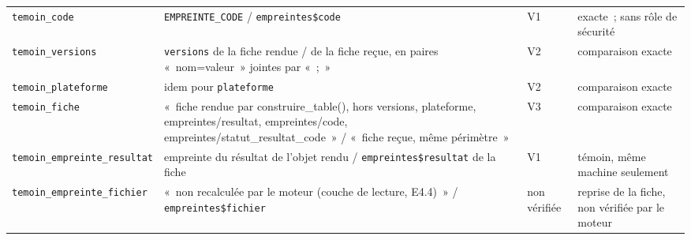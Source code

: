 \documentclass[a4paper,11pt]{article}
\newcommand{\code}[1]{\texttt{\small #1}}
\begin{document}
{\begin{longtable}{@{}p{4.8cm}p{5.1cm}p{2.2cm}p{2.5cm}@{}}
\code{temoin\_code} & \code{EMPREINTE\_CODE} / \code{empreintes\$code} & V1 & exacte~; sans rôle de sécurité \\
\code{temoin\_versions} & \code{versions} de la fiche rendue / de la fiche reçue, en paires «~nom=valeur~» jointes par «~;~» & V2 & comparaison exacte \\
\code{temoin\_plateforme} & idem pour \code{plateforme} & V2 & comparaison exacte \\
\code{temoin\_fiche} & «~fiche rendue par construire\_table(), hors versions, plateforme, empreintes/resultat, empreintes/code, empreintes/statut\_resultat\_code~» / «~fiche reçue, même périmètre~» & V3 & comparaison exacte \\
\code{temoin\_empreinte\_resultat} & empreinte du résultat de l'objet rendu / \code{empreintes\$resultat} de la fiche & V1 & témoin, même machine seulement \\
\code{temoin\_empreinte\_fichier} & «~non recalculée par le moteur (couche de lecture, E4.4)~» / \code{empreintes\$fichier} & non vérifiée & reprise de la fiche, non vérifiée par le moteur \\
\end{longtable}
}
\end{document}
